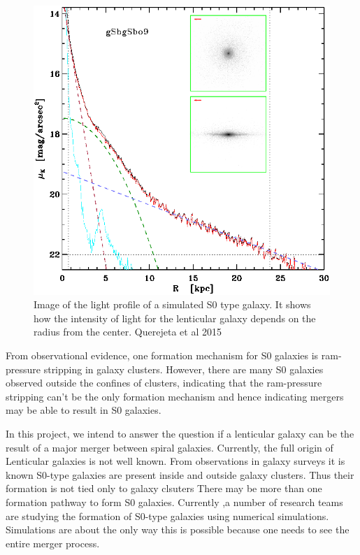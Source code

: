 \documentclass[fleqn,usenatbib]{mnras}
\begin{document}
\begin{figure}
    \centering
    \includegraphics{Figures/aa24303-14-fig12.eps}
    \caption{Image of the light profile of a simulated S0 type galaxy. It shows how the intensity of light for the lenticular galaxy depends on the radius from the center. Querejeta et al 2015}
    \label{profile_fig}
\end{figure}
From observational evidence, one formation mechanism for S0 galaxies is ram-pressure stripping in galaxy clusters\citep{Querejeta_2015}. However, there are many S0 galaxies observed outside the confines of clusters, indicating that the ram-pressure stripping can't be the only formation mechanism and hence indicating mergers may be able to result in S0 galaxies.

In this project, we intend to answer the question if a lenticular galaxy can be the result of a major merger between spiral galaxies. Currently, the full origin of Lenticular galaxies is not well known. From observations in galaxy surveys it is known S0-type galaxies are present inside and outside galaxy clusters. Thus their formation is not tied only to galaxy clsuters\citep{van_den_Bergh_2009} There may be more than one formation pathway to form S0 galaxies. Currently ,a number of research teams are studying the formation of S0-type galaxies using numerical simulations\citep{Querejeta_2015_2}. Simulations are about the only way this is possible because one needs to see the entire merger process.
\end{document}
